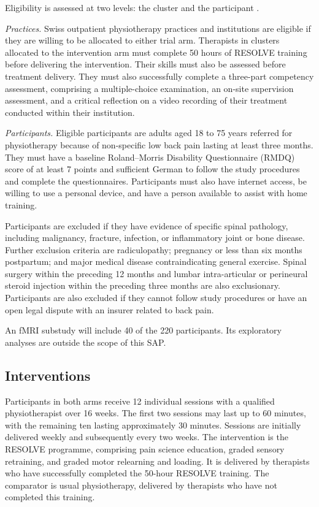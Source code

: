 \documentclass[11pt,a4paper]{article}
\begin{document}
Eligibility is assessed at two levels: the cluster and the participant
\citep{campbell2012}.

\emph{Practices.} Swiss outpatient physiotherapy practices and institutions
are eligible if they are willing to be allocated to either trial arm.
Therapists in clusters allocated to the intervention arm must complete 50
hours of RESOLVE training before delivering the intervention. Their skills
must also be assessed before treatment delivery. They must also successfully
complete a three-part competency assessment, comprising a multiple-choice
examination, an on-site supervision assessment, and a critical reflection on
a video recording of their treatment conducted within their institution.

\emph{Participants.} Eligible participants are adults aged 18 to 75 years
referred for physiotherapy because of non-specific low back pain lasting at
least three months. They must have a baseline Roland--Morris Disability
Questionnaire (RMDQ) score of at least 7 points
and sufficient German to follow the study procedures and complete the
questionnaires.
Participants must also have internet access, be willing to use a personal
device, and have a person available to assist with home training.

Participants are excluded if they have evidence of specific spinal pathology,
including malignancy, fracture, infection, or inflammatory joint or bone
disease. Further exclusion criteria are radiculopathy; pregnancy or less than
six months postpartum; and major medical disease contraindicating general
exercise. Spinal surgery within the preceding 12 months and lumbar
intra-articular or perineural steroid injection within the preceding three
months are also exclusionary. Participants are also excluded if they cannot
follow study procedures or have an open legal dispute with an insurer related
to back pain.

An fMRI substudy will include 40 of the 220 participants. Its exploratory
analyses are outside the scope of this SAP.

\subsection{Interventions}

Participants in both arms receive 12 individual sessions with a qualified
physiotherapist over 16 weeks. The first two sessions may last up to 60
minutes, with the remaining ten lasting approximately 30 minutes. Sessions are
initially delivered weekly and subsequently every two weeks. The intervention
is the RESOLVE programme, comprising pain science education, graded sensory
retraining, and graded motor relearning and loading. It is delivered by
therapists who have successfully completed the 50-hour RESOLVE training. The comparator is
usual physiotherapy, delivered by therapists who have not completed this
training.
\end{document}
